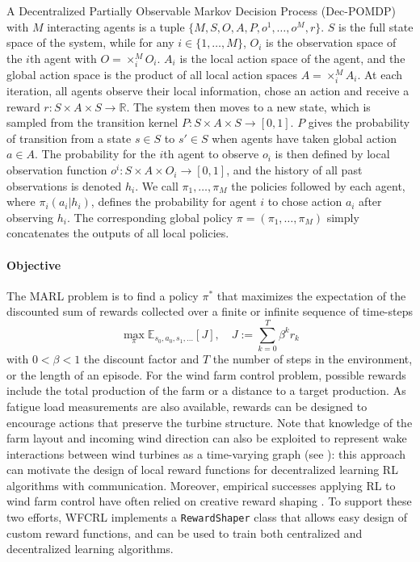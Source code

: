 \documentclass{article}
\newcommand{\jz}[1]{{\color{blue}#1}}
\begin{document}
A Decentralized Partially Observable Markov Decision Process (Dec-POMDP) with $M$ interacting agents is a tuple $\{M, S, O, A, P, o^1, \dots, o^M, r\}$. $S$ is the full state space of the system, while for any $i \in \{ 1, \dots, M \}$, $O_i$ is the observation space of the $i$th agent with $O = \times_{i}^M O_i$. $A_i$ is the local action space of the agent, and the global action space is the product of all local action spaces $A = \times_{i}^M A_i$.  
At each iteration, all agents observe their local information, chose an action and receive a reward $r : S \times A \times S \rightarrow \mathbb{R}$. The system then moves to a new state, which is sampled from the transition kernel $P : S \times A \times S \rightarrow [0,1]$. $P$ gives the probability of transition from a state $s \in S$ to $s' \in S$ when agents have taken global action $a \in A$. The probability for the $i$th agent to observe $o_i$ is then defined by local observation function $o^i: S \times A \times O_i \rightarrow [0,1]$, and the history of all past observations is denoted $h_i$.
We call $\pi_1, \dots, \pi_M$ the policies followed by each agent, where $\pi_i(a_i | h_i)$, defines the probability for agent $i$ to chose action $a_i$ after observing $h_i$. The corresponding global policy $\pi = (\pi_1, \dots, \pi_M)$ simply concatenates the outputs of all local policies. 
%
\paragraph{Objective} The MARL problem is to
find a policy $\pi^*$ that maximizes the expectation of the discounted sum of rewards collected over a finite or infinite sequence of time-steps
\begin{equation} \label{expected_cost}
    \max_{\pi} \mathbb{E}_{s_0, a_0, s_1, \dots} \left[ J \right], \quad J:= \sum_{k=0}^T \beta^k r_k
\end{equation}
with  $0 < \beta < 1$ the discount factor and $T$ the number of steps in the environment, or the length of an episode.
For the wind farm control problem, possible rewards include the total production of the farm or a distance to a target production. As fatigue load measurements are also available, rewards can be designed to encourage actions that preserve the turbine structure. Note that knowledge of the farm layout and incoming wind direction can also be exploited to represent wake interactions between wind turbines as a time-varying graph (see ): this approach can motivate the design of local reward functions for decentralized learning RL algorithms with communication. Moreover, empirical successes applying RL to wind farm control have often relied on creative reward shaping \cite{abkar2023_rlwfc,drl-high-fidelity}. To support these two efforts, WFCRL implements a \texttt{RewardShaper} class that allows easy design of custom reward functions, and can be used to train both centralized and decentralized learning algorithms.
\end{document}

